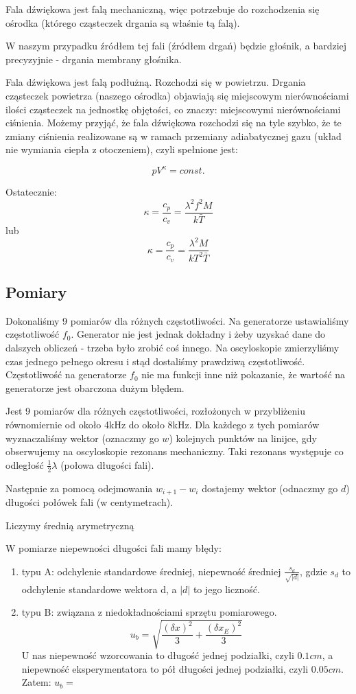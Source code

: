 \documentclass[12pt,a4paper]{article}
\begin{document}
Fala dźwiękowa jest falą mechaniczną, więc potrzebuje do rozchodzenia się ośrodka (którego cząsteczek drgania są właśnie tą falą).  

W naszym przypadku źródłem tej fali (źródłem drgań) będzie głośnik, a bardziej precyzyjnie - drgania membrany głośnika. 

Fala dźwiękowa jest falą podłużną. Rozchodzi się w powietrzu. Drgania cząsteczek powietrza (naszego ośrodka) objawiają się miejscowym nierównościami ilości cząsteczek na jednostkę objętości, co znaczy: miejscowymi nierównościami ciśnienia.
Możemy przyjąć, że fala dźwiękowa rozchodzi się na tyle szybko, że te zmiany ciśnienia realizowane są w ramach przemiany adiabatycznej gazu (układ nie wymiania ciepła z otoczeniem), czyli spełnione jest: 

$$
pV^\kappa = const.
$$


Ostatecznie:
$$
\kappa = \frac{c_p}{c_v} = \frac{\lambda^2 f^2 M}{k\bar{T}}
$$
lub
$$
\kappa = \frac{c_p}{c_v} = \frac{\lambda^2 M}{k T^2 \bar{T}}
$$


\subsection{Pomiary}
Dokonaliśmy 9 pomiarów dla różnych częstotliwości. Na generatorze ustawialiśmy częstotliwość $f_0$. Generator nie jest jednak dokładny i żeby uzyskać dane do dalszych obliczeń - trzeba było zrobić coś innego. Na oscyloskopie zmierzyliśmy czas jednego pełnego okresu i stąd dostaliśmy prawdziwą częstotliwość. Częstotliwość na generatorze $f_0$ nie ma funkcji inne niż pokazanie, że wartość na generatorze jest obarczona dużym błędem. 

Jest 9 pomiarów dla różnych częstotliwości, rozłożonych w przybliżeniu równomiernie od około 4kHz do około 8kHz. 
Dla każdego z tych pomiarów wyznaczaliśmy wektor (oznaczmy go $w$) kolejnych punktów na linijce, gdy obserwujemy na oscyloskopie rezonans mechaniczny. Taki rezonans występuje co odległość $\frac{1}{2}\lambda$ (połowa długości fali). 

Następnie za pomocą odejmowania $w_{i+1}-w_i$  dostajemy wektor (odnaczmy go $d$) długości połówek fali (w centymetrach). 

Liczymy średnią arymetryczną 

W pomiarze niepewności długości fali mamy błędy:
\begin{enumerate}
\item  typu A: odchylenie standardowe średniej, niepewność średniej $\frac{s_d}{\sqrt{|d|}}$, gdzie $s_d$ to odchylenie standardowe wektora d, a $|d|$ to jego liczność. 
\item typu B: związana z niedokładnościami sprzętu pomiarowego. $$u_b = \sqrt{\frac{(\delta x)^2}{3} + \frac{(\delta x_E)^2}{3}}$$
U nas niepewność wzorcowania to długość jednej podziałki, czyli $0.1 cm$, a niepewność eksperymentatora to pół długości jednej podziałki, czyli $0.05 cm$.
Zatem: $u_b = $
\end{enumerate} 
\end{document}
